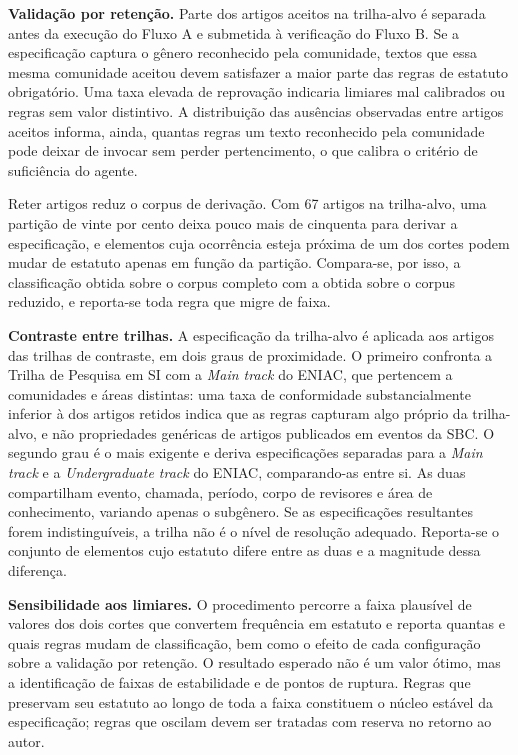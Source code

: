 \textbf{Validação por retenção.} Parte dos artigos aceitos na trilha-alvo é separada antes da execução do Fluxo A e submetida à verificação do Fluxo B. Se a especificação captura o gênero reconhecido pela comunidade, textos que essa mesma comunidade aceitou devem satisfazer a maior parte das regras de estatuto obrigatório. Uma taxa elevada de reprovação indicaria limiares mal calibrados ou regras sem valor distintivo. A distribuição das ausências observadas entre artigos aceitos informa, ainda, quantas regras um texto reconhecido pela comunidade pode deixar de invocar sem perder pertencimento, o que calibra o critério de suficiência do agente.

Reter artigos reduz o corpus de derivação. Com 67 artigos na trilha-alvo, uma partição de vinte por cento deixa pouco mais de cinquenta para derivar a especificação, e elementos cuja ocorrência esteja próxima de um dos cortes podem mudar de estatuto apenas em função da partição. Compara-se, por isso, a classificação obtida sobre o corpus completo com a obtida sobre o corpus reduzido, e reporta-se toda regra que migre de faixa.

\textbf{Contraste entre trilhas.} A especificação da trilha-alvo é aplicada aos artigos das trilhas de contraste, em dois graus de proximidade. O primeiro confronta a Trilha de Pesquisa em SI com a \textit{Main track} do ENIAC, que pertencem a comunidades e áreas distintas: uma taxa de conformidade substancialmente inferior à dos artigos retidos indica que as regras capturam algo próprio da trilha-alvo, e não propriedades genéricas de artigos publicados em eventos da SBC. O segundo grau é o mais exigente e deriva especificações separadas para a \textit{Main track} e a \textit{Undergraduate track} do ENIAC, comparando-as entre si. As duas compartilham evento, chamada, período, corpo de revisores e área de conhecimento, variando apenas o subgênero. Se as especificações resultantes forem indistinguíveis, a trilha não é o nível de resolução adequado. Reporta-se o conjunto de elementos cujo estatuto difere entre as duas e a magnitude dessa diferença.

\textbf{Sensibilidade aos limiares.} O procedimento percorre a faixa plausível de valores dos dois cortes que convertem frequência em estatuto e reporta quantas e quais regras mudam de classificação, bem como o efeito de cada configuração sobre a validação por retenção. O resultado esperado não é um valor ótimo, mas a identificação de faixas de estabilidade e de pontos de ruptura. Regras que preservam seu estatuto ao longo de toda a faixa constituem o núcleo estável da especificação; regras que oscilam devem ser tratadas com reserva no retorno ao autor.


